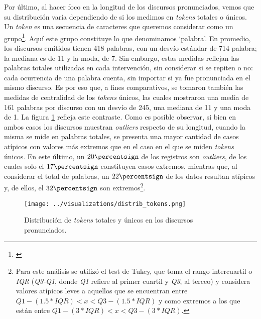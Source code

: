 Por último, al hacer foco en la longitud de los discursos pronunciados, vemos que su
distribución varía dependiendo de si los medimos en \textit{tokens} totales o únicos.
Un \textit{token} es una secuencia de caracteres que queremos considerar como un
grupo\footnote{\citet*{bird2009natural}}. Aquí este grupo constituye lo que denominamos
`palabra'. En promedio, los discursos emitidos tienen 418 palabras, con un desvío
estándar de 714 palabra; la mediana es de 11 y la moda, de 7. Sin embargo, estas medidas
reflejan las palabras totales utilizadas en cada intervención, sin considerar si se repiten
o no: cada ocurrencia de una palabra cuenta, sin importar si ya fue pronunciada en el mismo
discurso. Es por eso que, a fines comparativos, se tomaron también las medidas de centralidad
de los \textit{tokens} únicos, las cuales mostraron una media de 161 palabras por discurso
con un desvío de 245, una mediana de 11 y una moda de 1. La figura \ref{fig-distrib-tokens}
refleja este contraste. Como es posible observar, si bien en ambos casos los discursos
muestran \textit{outliers} respecto de su longitud, cuando la misma se mide en palabras
totales, se presenta una mayor cantidad de casos atípicos con valores más extremos que en
el caso en el que se miden \textit{tokens} únicos. En este último, un
$20\percentsign$ de los registros son \textit{outliers}, de los cuales solo el
$17\percentsign$ constituyen casos extremos, mientras que, al considerar
el total de palabras, un $22\percentsign$ de los datos resultan atípicos y,
de ellos, el $32\percentsign$ son extremos\footnote{Para este análisis se utilizó el
test de Tukey, que toma el rango intercuartil o \textit{IQR} (\textit{Q3-Q1}, donde
\textit{Q1} refiere al primer cuartil y \textit{Q3}, al terceo) y considera
valores atípicos leves a aquellos que se encuentran entre
$Q1 - (1.5 * IQR) < x < Q3 - (1.5 * IQR)$ y como extremos a los que están entre
$Q1 - (3 * IQR) < x < Q3 - (3 * IQR)$.}.

\begin{figure}[h!]
    \centering
    \texttt{[image: ../visualizations/distrib\_tokens.png]}
    \caption{Distribución de \textit{tokens} totales y únicos en los discursos pronunciados.}
    \label{fig-distrib-tokens}
\end{figure}


